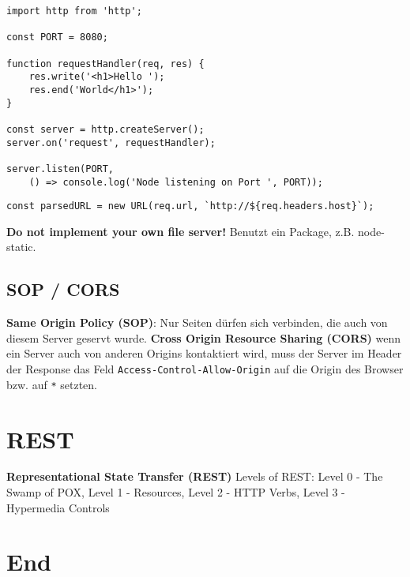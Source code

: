 \documentclass[11pt,twoside,landscape]{article}
\begin{document}
\begin{multicols}{4}
\begin{verbatim}
import http from 'http';

const PORT = 8080;

function requestHandler(req, res) {
    res.write('<h1>Hello ');
    res.end('World</h1>');
}

const server = http.createServer();
server.on('request', requestHandler);

server.listen(PORT,
	() => console.log('Node listening on Port ', PORT));
\end{verbatim}

\begin{verbatim}
const parsedURL = new URL(req.url, `http://${req.headers.host}`);
\end{verbatim}

\textbf{Do not implement your own file server!} Benutzt ein Package, z.B. node-static.


\subsection*{SOP / CORS}
\label{sec:org4a37bac}
\textbf{Same Origin Policy (SOP)}: Nur Seiten dürfen sich verbinden, die auch von diesem Server geservt wurde. \textbf{Cross Origin Resource Sharing (CORS)} wenn ein Server auch von anderen Origins kontaktiert wird, muss der Server im Header der Response das Feld \texttt{Access-Control-Allow-Origin} auf die Origin des Browser bzw. auf \texttt{*} setzten.


\section*{REST}
\label{sec:org75ea070}
\textbf{Representational State Transfer (REST)}
Levels of REST: Level 0 - The Swamp of POX, Level 1 - Resources, Level 2 - HTTP Verbs, Level 3 - Hypermedia Controls

\section*{End}
\label{sec:orgd00eec7}
\end{multicols}
\end{document}
